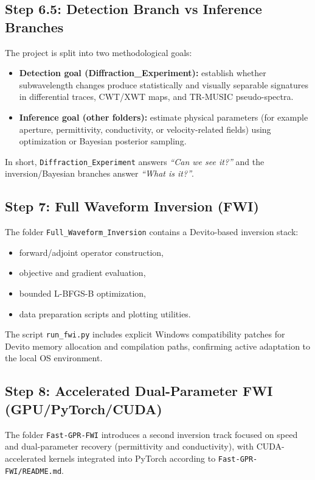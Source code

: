\documentclass[11pt,a4paper]{article}
\newcommand{\repo}[1]{\texttt{#1}}
\begin{document}
\subsection*{Step 6.5: Detection Branch vs Inference Branches}
The project is split into two methodological goals:
\begin{itemize}
    \item \textbf{Detection goal (Diffraction\_Experiment):} establish whether subwavelength changes produce statistically and visually separable signatures in differential traces, CWT/XWT maps, and TR-MUSIC pseudo-spectra.
    \item \textbf{Inference goal (other folders):} estimate physical parameters (for example aperture, permittivity, conductivity, or velocity-related fields) using optimization or Bayesian posterior sampling.
\end{itemize}
In short, \repo{Diffraction\_Experiment} answers \textit{``Can we see it?''} and the inversion/Bayesian branches answer \textit{``What is it?''}.

\subsection*{Step 7: Full Waveform Inversion (FWI)}
The folder \repo{Full\_Waveform\_Inversion} contains a Devito-based inversion stack:
\begin{itemize}
    \item forward/adjoint operator construction,
    \item objective and gradient evaluation,
    \item bounded L-BFGS-B optimization,
    \item data preparation scripts and plotting utilities.
\end{itemize}
The script \repo{run\_fwi.py} includes explicit Windows compatibility patches for Devito memory allocation and compilation paths, confirming active adaptation to the local OS environment.

\subsection*{Step 8: Accelerated Dual-Parameter FWI (GPU/PyTorch/CUDA)}
The folder \repo{Fast-GPR-FWI} introduces a second inversion track focused on speed and dual-parameter recovery (permittivity and conductivity), with CUDA-accelerated kernels integrated into PyTorch according to \repo{Fast-GPR-FWI/README.md}.
\end{document}
